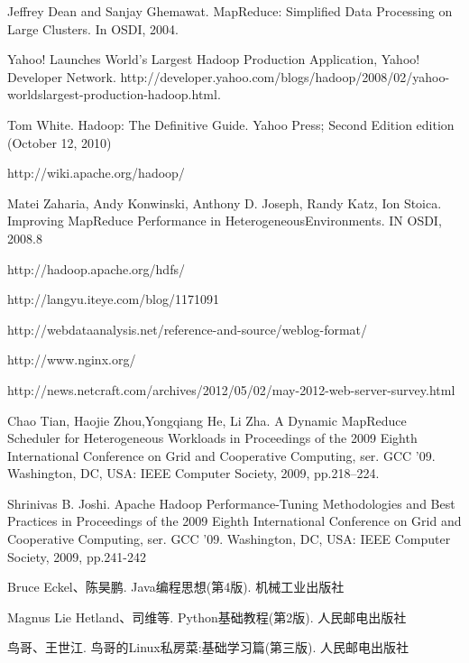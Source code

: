 \fontsize{10.5pt}{10.5pt}\selectfont
\begin{thebibliography}{10}

Jeffrey Dean and Sanjay Ghemawat.
\newblock MapReduce: Simplified Data Processing on Large Clusters.
\newblock In OSDI, 2004.

Yahoo! Launches World’s Largest Hadoop Production Application, Yahoo! Developer Network.
\newblock http://developer.yahoo.com/blogs/hadoop/2008/02/yahoo-worldslargest-production-hadoop.html.

Tom White.
\newblock Hadoop: The Definitive Guide.
\newblock Yahoo Press; Second Edition edition (October 12, 2010)

http://wiki.apache.org/hadoop/

Matei Zaharia, Andy Konwinski, Anthony D. Joseph, Randy Katz, Ion Stoica.
\newblock Improving MapReduce Performance in HeterogeneousEnvironments.
\newblock IN OSDI, 2008.8

http://hadoop.apache.org/hdfs/



http://langyu.iteye.com/blog/1171091

http://webdataanalysis.net/reference-and-source/weblog-format/

http://www.nginx.org/

http://news.netcraft.com/archives/2012/05/02/may-2012-web-server-survey.html


Chao Tian, Haojie Zhou,Yongqiang He, Li Zha.
\newblock A Dynamic MapReduce Scheduler for Heterogeneous Workloads
\newblock in Proceedings of the 2009 Eighth International Conference on Grid and Cooperative Computing, ser. GCC ’09. Washington, DC, USA: IEEE Computer Society, 2009, pp.218–224.

Shrinivas B. Joshi.
\newblock Apache Hadoop Performance-Tuning Methodologies and Best Practices
\newblock in Proceedings of the 2009 Eighth International Conference on Grid and Cooperative Computing, ser. GCC ’09. Washington, DC, USA: IEEE Computer Society, 2009, pp.241-242 

Bruce Eckel、陈昊鹏.
\newblock Java编程思想(第4版).
\newblock 机械工业出版社

Magnus Lie Hetland、司维等.
\newblock Python基础教程(第2版).
\newblock 人民邮电出版社

鸟哥、王世江.
\newblock 鸟哥的Linux私房菜:基础学习篇(第三版).
\newblock 人民邮电出版社

\end{thebibliography}
